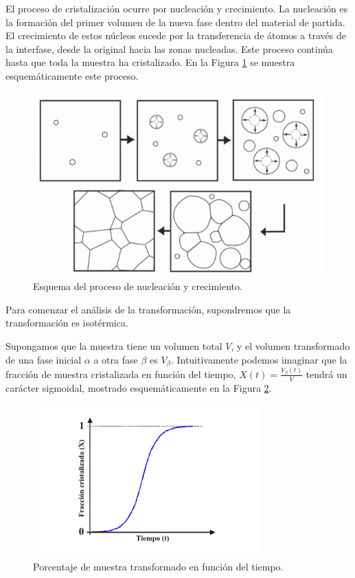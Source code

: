 \documentclass[12pt]{article}
\theoremstyle{definition}
\theoremstyle{remark}
\begin{document}
 El proceso de cristalización ocurre por nucleación y crecimiento. La nucleación es la formación del primer volumen de la nueva fase dentro del material de partida. El crecimiento de estos núcleos sucede por la transferencia de átomos a través de la interfase, desde la original hacia las zonas nucleadas. Este proceso continúa hasta que toda la muestra ha cristalizado. En la Figura \ref{cristalization} se muestra esquemáticamente este proceso.
 \begin{figure}[H]
 	\centering
	\includegraphics[scale=0.5]{img/cristalization.png}
 	\caption{Esquema del proceso de nucleación y crecimiento.}
	\label{cristalization}
\end{figure} 

Para comenzar el análisis de la transformación, supondremos que la transformación es isotérmica.

Supongamos que la muestra tiene un volumen total $V$, y el volumen transformado de una fase inicial $\alpha$ a otra fase $\beta$ es $V_\beta$. Intuitivamente podemos imaginar que la fracción de muestra cristalizada en función del tiempo, $X(t) = \frac{V_\beta (t)}{V}$ tendrá un carácter sigmoidal, mostrado esquemáticamente en la Figura \ref{cvst}.

 \begin{figure}[H]
 	\centering
	\includegraphics[scale=1]{img/cristalization_vs_tiempo.png}
 	\caption{Porcentaje de muestra transformado en función del tiempo.}
	\label{cvst}
\end{figure} 
\end{document}
